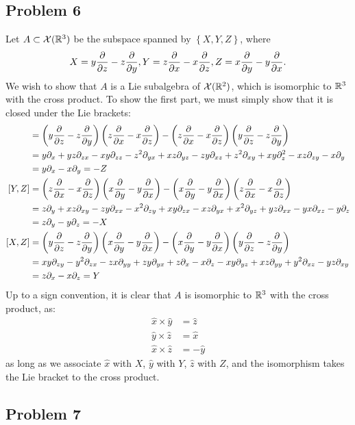 \documentclass{../../mathnotes}
\begin{document}
\subsection*{Problem 6}

Let $A\subset\mathcal{X}(\mathbb{R}^3)$ be the subspace spanned by $\left\{ X,Y,Z \right\}$, where
\begin{align*}
    X=y\frac{\partial}{\partial z}-z\frac{\partial}{\partial y}, Y=z\frac{\partial}{\partial x}-x\frac{\partial}{\partial z}, Z=x\frac{\partial}{\partial y}-y\frac{\partial}{\partial x}.
\end{align*}
We wish to show that $A$ is a Lie subalgebra of $\mathcal{X}(\mathbb{R}^2)$, which is isomorphic to $\mathbb{R}^3$ with the
cross product. To show the first part, we must simply show that it is closed under the Lie brackets:
\begin{align*}
    [X,Y]&=\left( y\frac{\p}{\p z}-z\frac{\p}{\p y} \right)\left( z\frac{\p}{\p x}-x\frac{\p}{\p z} \right)
    -\left( z\frac{\p}{\p x}-x\frac{\p}{\p z} \right)\left( y\frac{\p}{\p z}-z\frac{\p}{\p y} \right)\\
    &=y\p_x+yz\p_{zx}-xy\p_{zz}-z^2\p_{yx}+xz\p_{yz}
    -zy\p_{xz}+z^2\p_{xy}+xy\p_z^2-xz\p_{zy}-x\p_y\\
    &=y\p_x-x\p_y=-Z\\
    [Y,Z]&=\left( z\frac{\p}{\p x}-x\frac{\p}{\p z} \right)\left( x\frac{\p}{\p y}-y\frac{\p}{\p x} \right)
    -\left( x\frac{\p}{\p y}-y\frac{\p}{\p x} \right)\left( z\frac{\p}{\p x}-x\frac{\p}{\p z} \right)\\
    &=z\p_y+xz\p_{xy}-zy\p_{xx}-x^2\p_{zy}+xy\p_{zx}-xz\p_{yx}+x^2\p_{yz}+yz\p_{xx}-yx\p_{xz}-y\p_z\\
    &=z\p_y-y\p_z=-X\\
    [X,Z]&=\left( y\frac{\p}{\p z}-z\frac{\p}{\p y} \right)\left( x\frac{\p}{\p y}-y\frac{\p}{\p x} \right)
    -\left( x\frac{\p}{\p y}-y\frac{\p}{\p x} \right)\left( y\frac{\p}{\p z}-z\frac{\p}{\p y} \right)\\
    &=xy\p_{zy}-y^2\p_{zx}-zx\p_{yy}+zy\p_{yx}+z\p_x-x\p_z-xy\p_{yz}+xz\p_{yy}+y^2\p_{xz}-yz\p_{xy}\\
    &=z\p_x-x\p_z=Y
\end{align*}
Up to a sign convention, it is clear that $A$ is isomorphic to $\mathbb{R}^3$ with the cross product,
as:
\begin{align*}
    \hat x \times \hat y &= \hat z\\
    \hat y \times \hat z &= \hat x\\
    \hat x \times \hat z &= - \hat y
\end{align*}
as long as we associate $\hat x$ with $X$, $\hat y$ with $Y$, $\hat z$ with $Z$, and the isomorphism
takes the Lie bracket to the cross product.

\subsection*{Problem 7}
\end{document}
